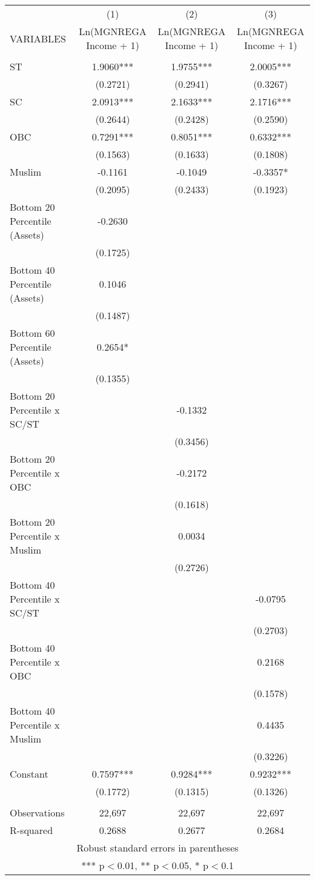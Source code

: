 \documentclass[]{article}
\begin{document}
\begin{tabular}{lccc} \hline
 & (1) & (2) & (3) \\
VARIABLES & Ln(MGNREGA Income + 1) & Ln(MGNREGA Income + 1) & Ln(MGNREGA Income + 1) \\ \hline
 &  &  &  \\
ST & 1.9060*** & 1.9755*** & 2.0005*** \\
 & (0.2721) & (0.2941) & (0.3267) \\
SC & 2.0913*** & 2.1633*** & 2.1716*** \\
 & (0.2644) & (0.2428) & (0.2590) \\
OBC & 0.7291*** & 0.8051*** & 0.6332*** \\
 & (0.1563) & (0.1633) & (0.1808) \\
Muslim & -0.1161 & -0.1049 & -0.3357* \\
 & (0.2095) & (0.2433) & (0.1923) \\
Bottom 20 Percentile (Assets) & -0.2630 &  &  \\
 & (0.1725) &  &  \\
Bottom 40 Percentile (Assets) & 0.1046 &  &  \\
 & (0.1487) &  &  \\
Bottom 60 Percentile (Assets) & 0.2654* &  &  \\
 & (0.1355) &  &  \\
Bottom 20 Percentile x SC/ST &  & -0.1332 &  \\
 &  & (0.3456) &  \\
Bottom 20 Percentile x OBC &  & -0.2172 &  \\
 &  & (0.1618) &  \\
Bottom 20 Percentile x Muslim &  & 0.0034 &  \\
 &  & (0.2726) &  \\
Bottom 40 Percentile x SC/ST &  &  & -0.0795 \\
 &  &  & (0.2703) \\
Bottom 40 Percentile x OBC &  &  & 0.2168 \\
 &  &  & (0.1578) \\
Bottom 40 Percentile x Muslim &  &  & 0.4435 \\
 &  &  & (0.3226) \\
Constant & 0.7597*** & 0.9284*** & 0.9232*** \\
 & (0.1772) & (0.1315) & (0.1326) \\
 &  &  &  \\
Observations & 22,697 & 22,697 & 22,697 \\
 R-squared & 0.2688 & 0.2677 & 0.2684 \\ \hline
\multicolumn{4}{c}{ Robust standard errors in parentheses} \\
\multicolumn{4}{c}{ *** p$<$0.01, ** p$<$0.05, * p$<$0.1} \\
\end{tabular}
\end{document}
